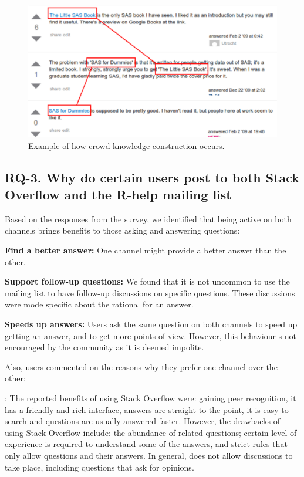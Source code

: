     \begin{figure} [!htb]
        \centering
        \includegraphics[width=\columnwidth]{Figures/SO-CSimg2}
        \caption{Example of how crowd knowledge construction occurs.}
        \label{fig:CKC_MLSO}
    \end{figure}

\subsection{RQ-3. Why do certain users post to both Stack Overflow and the R-help mailing list}

Based on the responses from the survey, we identified that being active on both channels brings benefits to those asking and answering questions:

\begin{packed_enum}
\item \textbf{Find a better answer:} One channel might provide a better answer than the other.
\item \textbf{Support follow-up questions:} We found that it is not uncommon to use the mailing list to have follow-up discussions on specific \SO
  questions. These discussions were mode specific about the rational for an answer.
\item \textbf{Speeds up answers:} Users ask the same question on both channels to speed up getting an answer, and to get more points of view. However, this behaviour s not encouraged by the community as it is deemed impolite.
\end{packed_enum}

 Also, users commented on the reasons why they prefer one channel over the other:

\noindent\textbf{\SO}:
    The reported benefits of using Stack Overflow were: gaining peer recognition, it has a friendly and rich interface, answers are straight to the point, it is
    easy to search and questions are usually answered faster.
    However, the drawbacks of using Stack Overflow include: the abundance
    of related questions; certain level of experience is required to understand some of the answers, and \SO strict rules that only allow questions and their answers. In
    general, \SO does not allow discussions to take place, including questions that ask for opinions.

